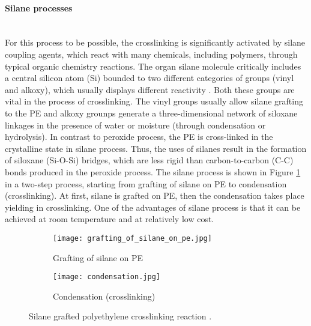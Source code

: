 \paragraph{Silane processes} \hfill \\
For this process to be possible, the crosslinking is significantly activated by silane coupling agents, which react with many chemicals, including polymers, through typical organic chemistry reactions. The organ silane molecule critically includes a central silicon atom (Si) bounded to two different categories of groups (vinyl and alkoxy), which usually displays different reactivity \cite{kurtz2009cross}. Both these groups are vital in the process of crosslinking. The vinyl groups usually allow silane grafting to the PE and alkoxy grounps generate a three-dimensional network of siloxane linkages in the presence of water or moisture (through condensation or hydrolysis).
In contrast to peroxide process, the PE is cross-linked in the crystalline state in silane process. Thus, the uses of silanes result in the formation of siloxane (Si-O-Si) bridges, which are less rigid than carbon-to-carbon (C-C) bonds produced in the peroxide process. The silane process is shown in Figure \ref{ch3:figure:reaction} in a two-step process, starting from grafting of silane on PE to condensation (crosslinking). At first, silane is grafted on PE, then the condensation takes place yielding in crosslinking. One of the advantages of silane process is that it can be achieved at room temperature and at relatively low cost. 

\begin{figure}[H]
\captionsetup[subfigure]{justification=raggedright}
\centering

\begin{subfigure}{.9\textwidth}
    \centering
    \texttt{[image: grafting\_of\_silane\_on\_pe.jpg]}
    \caption{Grafting of silane on PE}
\end{subfigure}
\begin{subfigure}{.9\textwidth}
    \centering
    \texttt{[image: condensation.jpg]}
    \caption{Condensation (crosslinking)}
\end{subfigure}

\caption{Silane grafted polyethylene crosslinking reaction \cite{kurtz2009cross}.}
\label{ch3:figure:reaction}
\end{figure}

